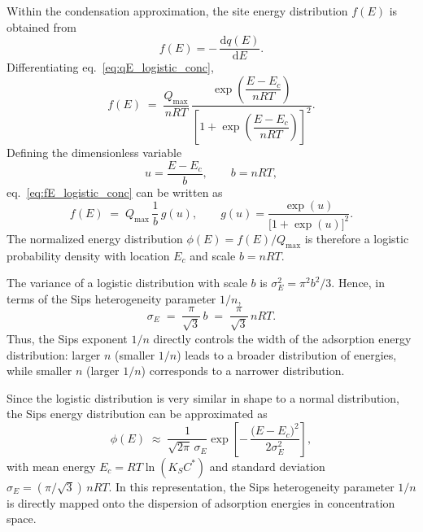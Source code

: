 	Within the condensation approximation, the site energy distribution
	\(f(E)\) is obtained from
	\begin{equation}
		f(E) = -\,\frac{\mathrm{d}q(E)}{\mathrm{d}E}.
	\end{equation}
	Differentiating eq.~\eqref{eq:qE_logistic_conc},
	\begin{equation}
		f(E)
		\;=\;
		\frac{Q_{\max}}{nRT}\,
		\frac{\exp\!\left(\dfrac{E - E_c}{nRT}\right)}
		{\left[1 + \exp\!\left(\dfrac{E - E_c}{nRT}\right)\right]^{2}}.
		\label{eq:fE_logistic_conc}
	\end{equation}
	Defining the dimensionless variable
	\begin{equation}
		u = \frac{E - E_c}{b},
		\qquad
		b = nRT,
	\end{equation}
	eq.~\eqref{eq:fE_logistic_conc} can be written as
	\begin{equation}
		f(E)
		\;=\;
		Q_{\max}\,\frac{1}{b}\,g(u),
		\qquad
		g(u) = \frac{\exp(u)}{\bigl[1 + \exp(u)\bigr]^{2}}.
	\end{equation}
	The normalized energy distribution
	\(\phi(E) = f(E)/Q_{\max}\) is therefore a logistic probability density
	with location \(E_c\) and scale \(b = nRT\).
	
	The variance of a logistic distribution with scale \(b\) is
	\(\sigma_E^{2} = \pi^{2} b^{2} / 3\). Hence, in terms of the Sips
	heterogeneity parameter \(1/n\),
	\begin{equation}
		\sigma_E
		\;=\;
		\frac{\pi}{\sqrt{3}}\,b
		\;=\;
		\frac{\pi}{\sqrt{3}}\,nRT.
		\label{eq:sigmaE_n_conc}
	\end{equation}
	Thus, the Sips exponent \(1/n\) directly controls the width of the
	adsorption energy distribution: larger \(n\) (smaller \(1/n\)) leads
	to a broader distribution of energies, while smaller \(n\) (larger
	\(1/n\)) corresponds to a narrower distribution.
	
	Since the logistic distribution is very similar in shape to a normal
	distribution, the Sips energy distribution can be approximated as
	\begin{equation}
		\phi(E)
		\;\approx\;
		\frac{1}{\sqrt{2\pi}\,\sigma_E}
		\exp\!\left[
		-\,\frac{\bigl(E - E_c\bigr)^{2}}{2\sigma_E^{2}}
		\right],
	\end{equation}
	with mean energy \(E_c = RT \ln(K_S C^{\ast})\) and standard deviation
	\(\sigma_E = (\pi/\sqrt{3})\,nRT\). In this representation, the Sips
	heterogeneity parameter \(1/n\) is directly mapped onto the dispersion
	of adsorption energies in concentration space.
	
